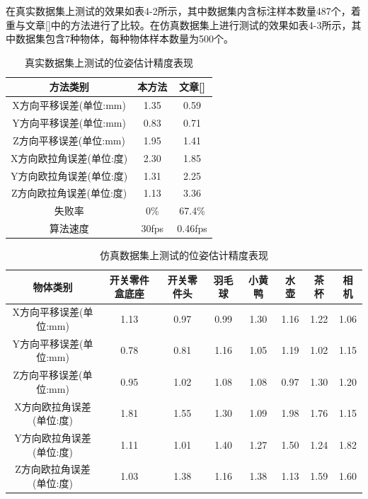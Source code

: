 在真实数据集上测试的效果如表4-2所示，其中数据集内含标注样本数量487个，着重与文章[]中的方法进行了比较。在仿真数据集上进行测试的效果如表4-3所示，其中数据集包含7种物体，每种物体样本数量为500个。
\begin{table}[htb]
	\caption{真实数据集上测试的位姿估计精度表现} 
	\centering 
	\begin{tabular}[t]{
		ccc} 
		\toprule
		方法类别 & 本方法 & 文章[\citenum{drost2010model}]\\ 
		\midrule
		X方向平移误差(单位:mm) & 1.35 & 0.59\\
		Y方向平移误差(单位:mm) & 0.83 & 0.71\\
		Z方向平移误差(单位:mm) & 1.95 & 1.41\\
		X方向欧拉角误差(单位:度) & 2.30 & 1.85\\
		Y方向欧拉角误差(单位:度) & 1.31 & 2.25\\
		Z方向欧拉角误差(单位:度) & 1.13 & 3.36\\
		\midrule
		失败率 & 0\% & 67.4\% \\
		\midrule
		算法速度 & 30fps & 0.46fps \\
		\bottomrule
	\end{tabular}
\end{table}

\begin{table}[htb]
	\caption{仿真数据集上测试的位姿估计精度表现} 
	\centering 
	\begin{tabular}[t]{
		cccccccc} 
		\toprule
		物体类别 & 开关零件盒底座 & 开关零件头 & 羽毛球 & 小黄鸭 & 水壶 & 茶杯 & 相机\\ 
		\midrule
		X方向平移误差(单位:mm) & 1.13 & 0.97 & 0.99& 1.30& 1.16&1.22 &1.06 \\
		Y方向平移误差(单位:mm) & 0.78 & 0.81 & 1.16&1.05 &1.19 &1.02 &1.15 \\
		Z方向平移误差(单位:mm) & 0.95 & 1.02 & 1.08& 1.08& 0.97& 1.30&1.20 \\
		X方向欧拉角误差(单位:度) & 1.81 & 1.55 &1.30 &1.09 &1.98 &1.76 &1.15 \\
		Y方向欧拉角误差(单位:度) & 1.11 & 1.01 &1.40 &1.27 &1.50 &1.24 &1.82 \\
		Z方向欧拉角误差(单位:度) & 1.03 & 1.38 &1.16 &1.38 &1.13 &1.59 &1.60 \\
		\bottomrule
	\end{tabular}
\end{table}

